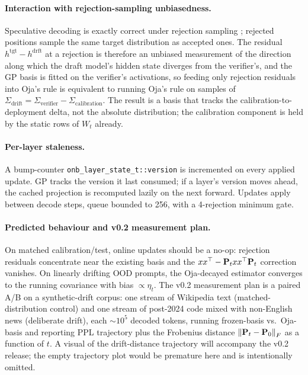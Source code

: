 \documentclass[11pt]{article}
\begin{document}
\paragraph{Interaction with rejection-sampling unbiasedness.}
Speculative decoding is exactly correct under rejection sampling
\cite{leviathan2023speculative}; rejected positions sample the same
target distribution as accepted ones. The residual
$h^\text{tgt}-h^\text{drft}$ at a rejection is therefore an unbiased
measurement of the direction along which the draft model's hidden state
diverges from the verifier's, and the GP basis is fitted on the
verifier's activations, so feeding only rejection residuals into Oja's
rule is equivalent to running Oja's rule on samples of
$\Sigma_\text{drift}=\Sigma_\text{verifier}-\Sigma_\text{calibration}$.
The result is a basis that tracks the calibration-to-deployment delta,
not the absolute distribution; the calibration component is held by the
static rows of $W_t$ already.

\paragraph{Per-layer staleness.}  A bump-counter
\texttt{onb\_layer\_state\_t::version} is incremented on every applied
update. GP tracks the version it last consumed; if a layer's version
moves ahead, the cached projection is recomputed lazily on the next
forward. Updates apply between decode steps, queue bounded to 256, with
a 4-rejection minimum gate.

\paragraph{Predicted behaviour and v0.2 measurement plan.}
On matched calibration/test, online updates should be a no-op:
rejection residuals concentrate near the existing basis and the
$xx^\top-\mathbf{P}_t xx^\top\mathbf{P}_t$ correction vanishes. On linearly
drifting OOD prompts, the Oja-decayed estimator converges to the
running covariance with bias $\propto\eta_t$. The v0.2 measurement plan
is a paired A/B on a synthetic-drift corpus: one stream of Wikipedia
text (matched-distribution control) and one stream of post-2024 code
mixed with non-English news (deliberate drift), each $\sim 10^5$
decoded tokens, running frozen-basis vs.\ Oja-basis and reporting PPL
trajectory plus the Frobenius distance $\left\lVert \mathbf{P}_t-\mathbf{P}_0 \right\rVert_F$ as a
function of $t$. A visual of the drift-distance trajectory will
accompany the v0.2 release; the empty trajectory plot would be
premature here and is intentionally omitted.
\end{document}
